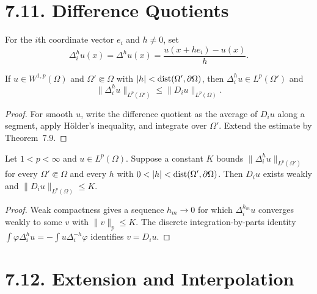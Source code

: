 \section*{7.11. Difference Quotients}

\begin{definition}
\label{gt:def-sobolev-difference-quotient}
For the $i$th coordinate vector $e_i$ and $h\neq0$, set
\begin{equation}
\tag{7.53}
\Delta_i^h u(x)=\Delta^h u(x)
=\frac{u(x+he_i)-u(x)}h.
\end{equation}
\end{definition}

\begin{lemma}
\label{gt:lem-sobolev-difference-quotient-bound}
If $u\in W^{1,p}(\Omega)$ and $\Omega'\Subset\Omega$ with
$|h|<\operatorname{dist}(\Omega',\partial\Omega)$, then
$\Delta_i^hu\in L^p(\Omega')$ and
\[
\|\Delta_i^hu\|_{L^p(\Omega')}\leq\|D_i u\|_{L^p(\Omega)}.
\]
\end{lemma}
\begin{proof}
\sketch For smooth $u$, write the difference quotient as the average of
$D_i u$ along a segment, apply H\"older's inequality, and integrate over $\Omega'$. Extend
the estimate by Theorem~7.9.
\end{proof}

\begin{lemma}
\label{gt:lem-sobolev-difference-quotient-criterion}
Let $1<p<\infty$ and $u\in L^p(\Omega)$. Suppose a constant $K$ bounds
$\|\Delta_i^hu\|_{L^p(\Omega')}$ for every $\Omega'\Subset\Omega$ and every
$h$ with $0<|h|<\dist(\Omega',\partial\Omega)$. Then $D_i u$ exists weakly
and $\|D_i u\|_{L^p(\Omega)}\leq K$.
\end{lemma}
\begin{proof}
\sketch Weak compactness gives a sequence $h_m\to0$ for which
$\Delta_i^{h_m}u$ converges weakly to some $v$ with $\|v\|_p\leq K$. The
discrete integration-by-parts identity
$\int\varphi\Delta_i^hu=-\int u\Delta_i^{-h}\varphi$ identifies
$v=D_i u$.
\end{proof}

\section*{7.12. Extension and Interpolation}

